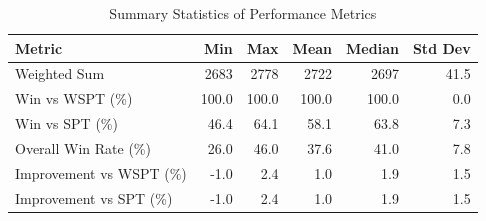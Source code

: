 \begin{table}[htbp]%
\centering%
\begin{tabular}{lrrrrr}%
\toprule%
\textbf{Metric}&\textbf{Min}&\textbf{Max}&\textbf{Mean}&\textbf{Median}&\textbf{Std Dev}\\%
\midrule%
Weighted Sum&2683&2778&2722&2697&41.5\\%
Win vs WSPT (\%)&100.0&100.0&100.0&100.0&0.0\\%
Win vs SPT (\%)&46.4&64.1&58.1&63.8&7.3\\%
Overall Win Rate (\%)&26.0&46.0&37.6&41.0&7.8\\%
Improvement vs WSPT (\%)&-1.0&2.4&1.0&1.9&1.5\\%
Improvement vs SPT (\%)&-1.0&2.4&1.0&1.9&1.5\\%
\bottomrule%
\end{tabular}%
\caption{Summary Statistics of Performance Metrics}%
\label{tab:metrics}%
\end{table}